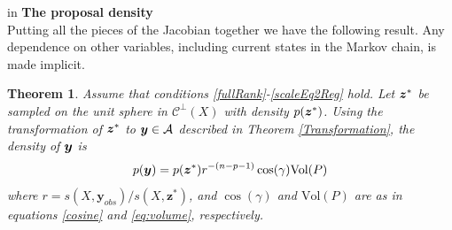 \documentclass[ba]{imsart}
\newcommand{\by}{\mbox{\boldmath $y$}}
\newcommand{\bz}{\mbox{\boldmath $z$}}
\newcommand{\mb}{\mathbf}
\newcommand{\mc}{\mathcal}
\newtheorem{theorem}{Theorem}[section]
\newcommand{\response}[1]{{\color{blue}#1}}
\begin{document}
 in
\noindent
{\bf The proposal density} \\
Putting all the pieces of the Jacobian together we have the following result. Any dependence on other variables, including current states in the Markov chain, is made implicit. 
\begin{theorem} 
Assume that conditions \ref{fullRank}-\ref{scaleEq2Reg} hold.  Let $\bz^{*}$ be sampled on the unit sphere in $\mc {C}^\perp (X)$ with density $p(\bz^{*})$.  Using the transformation of $\bz^*$ to $\by\in \mc A$ described in Theorem \ref{Transformation}, the density of $\by$ is
\begin{equation}
\label{dens:ystst}
p(\by)=p(\bz^*) r^{-(n-p-1)} \cos(\gamma)\text{Vol} (P)
\end{equation}
where $r={s(X,\boldsymbol{y}_{obs})}/{s(X,  \boldsymbol{z}^{*})}$,
and $\cos(\gamma)$ and $\text{Vol} (P)$ are as in equations \eqref{cosine} and \eqref{eq:volume}, respectively. 
\end{theorem} 
\end{document}
